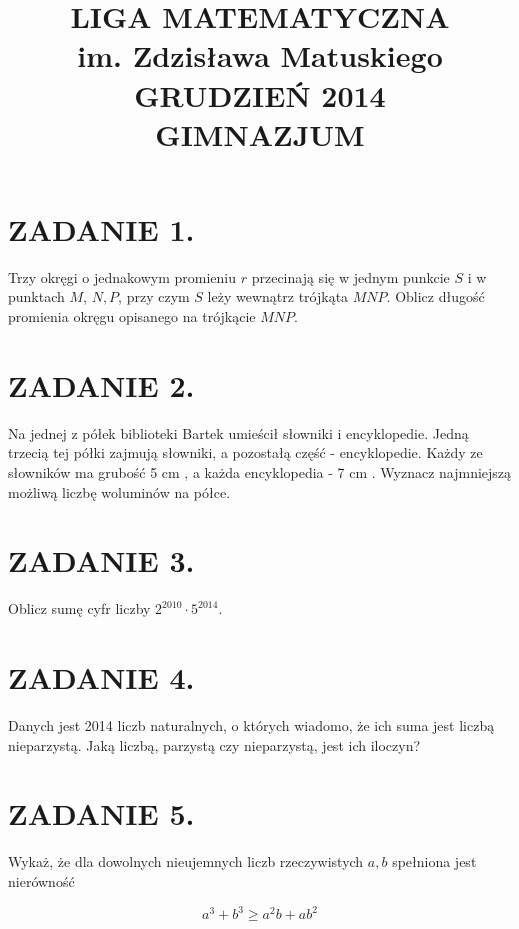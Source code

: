 \documentclass[10pt]{article}
\title{LIGA MATEMATYCZNA \\
 im. Zdzisława Matuskiego \\
 GRUDZIEŃ 2014 \\
 GIMNAZJUM }
\author{}
\date{}
\begin{document}
\maketitle
\section*{ZADANIE 1.}
Trzy okręgi o jednakowym promieniu \(r\) przecinają się w jednym punkcie \(S\) i w punktach \(M\), \(N, P\), przy czym \(S\) leży wewnątrz trójkąta \(M N P\). Oblicz długość promienia okręgu opisanego na trójkącie \(M N P\).

\section*{ZADANIE 2.}
Na jednej z półek biblioteki Bartek umieścił słowniki i encyklopedie. Jedną trzecią tej półki zajmują słowniki, a pozostałą część - encyklopedie. Każdy ze słowników ma grubość 5 cm , a każda encyklopedia - 7 cm . Wyznacz najmniejszą możliwą liczbę woluminów na półce.

\section*{ZADANIE 3.}
Oblicz sumę cyfr liczby \(2^{2010} \cdot 5^{2014}\).

\section*{ZADANIE 4.}
Danych jest 2014 liczb naturalnych, o których wiadomo, że ich suma jest liczbą nieparzystą. Jaką liczbą, parzystą czy nieparzystą, jest ich iloczyn?

\section*{ZADANIE 5.}
Wykaż, że dla dowolnych nieujemnych liczb rzeczywistych \(a, b\) spełniona jest nierówność

\[
a^{3}+b^{3} \geqslant a^{2} b+a b^{2}
\]
\end{document}
